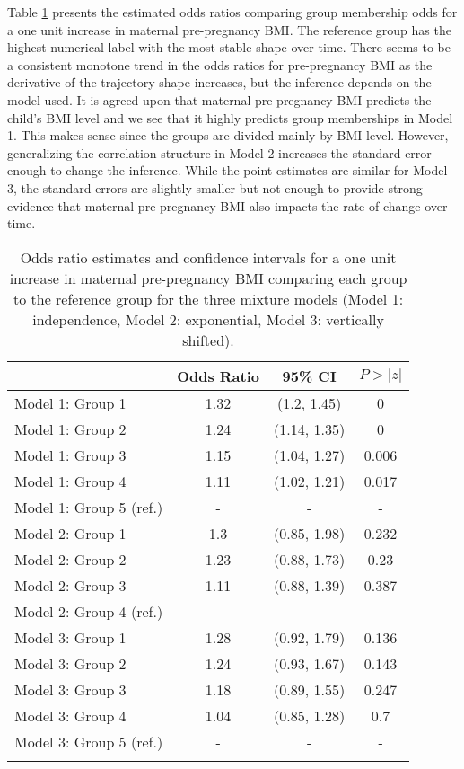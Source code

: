 Table \ref{tab:6-1} presents the estimated odds ratios comparing group membership odds for a one unit increase in maternal pre-pregnancy BMI. The reference group has the highest numerical label with the most stable shape over time. There seems to be a consistent monotone trend in the odds ratios for pre-pregnancy BMI as the derivative of the trajectory shape increases, but the inference depends on the model used. It is agreed upon that maternal pre-pregnancy BMI predicts the child's BMI level and we see that it highly predicts group memberships in Model 1. This makes sense since the groups are divided mainly by BMI level. However, generalizing the correlation structure in Model 2 increases the standard error enough to change the inference. While the point estimates are similar for Model 3, the standard errors are slightly smaller but not enough to provide strong evidence that maternal pre-pregnancy BMI also impacts the rate of change over time. 

\begin{table}[ht]
\centering
\begin{tabular}{lccc}
  \thickhline
 & Odds Ratio & 95\% CI& $P>|z|$ \\ 
  \hline
Model 1: Group  1 & 1.32 & (1.2, 1.45) & 0 \\ 
  Model 1: Group  2 & 1.24 & (1.14, 1.35) & 0 \\ 
  Model 1: Group  3 & 1.15 & (1.04, 1.27) & 0.006 \\ 
  Model 1: Group  4 & 1.11 & (1.02, 1.21) & 0.017 \\ 
  Model 1: Group  5  (ref.) & - & - & - \\ 
  Model 2: Group  1 & 1.3 & (0.85, 1.98) & 0.232 \\ 
  Model 2: Group  2 & 1.23 & (0.88, 1.73) & 0.23 \\ 
  Model 2: Group  3 & 1.11 & (0.88, 1.39) & 0.387 \\ 
  Model 2: Group  4  (ref.) & - & - & - \\ 
  Model 3: Group  1 & 1.28 & (0.92, 1.79) & 0.136 \\ 
  Model 3: Group  2 & 1.24 & (0.93, 1.67) & 0.143 \\ 
  Model 3: Group  3 & 1.18 & (0.89, 1.55) & 0.247 \\ 
  Model 3: Group  4 & 1.04 & (0.85, 1.28) & 0.7 \\ 
  Model 3: Group  5  (ref.) & - & - & - \\ 
   \thickhline
\end{tabular}
\caption{Odds ratio estimates and confidence intervals for a one unit increase in maternal pre-pregnancy BMI comparing each group to the reference group for the three mixture models (Model 1: independence, Model 2: exponential, Model 3: vertically shifted). }
\label{tab:6-1}
\end{table}

